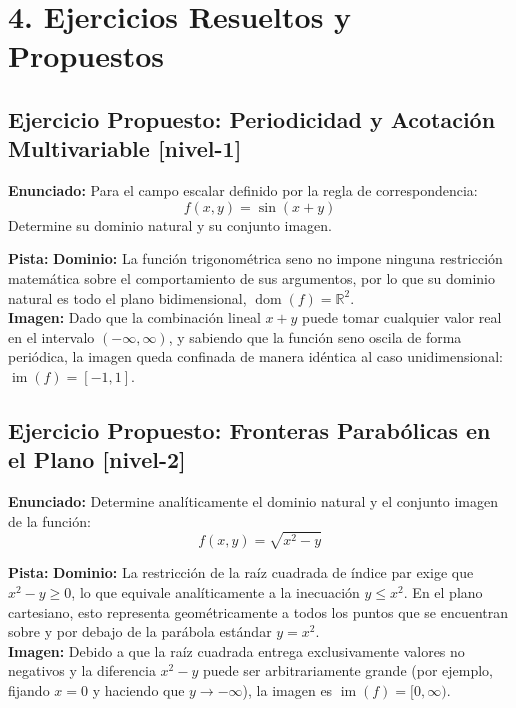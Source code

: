 \documentclass[11pt]{article}
\newenvironment{ejercicios}{%
  \section*{4. Ejercicios Resueltos y Propuestos}%
}{}
\newenvironment{ejerciciopropuesto}[2]{\subsection*{Ejercicio Propuesto: #1 \small{[#2]}}}{}
\newcommand{\enunciado}[1]{\textbf{Enunciado:} #1\par\vspace{0.2cm}}
\newcommand{\pista}[1]{\textbf{Pista:} #1\par\vspace{0.4cm}}
\begin{document}
\begin{ejercicios}
  \begin{ejerciciopropuesto}{Periodicidad y Acotación Multivariable}{nivel-1}
    \enunciado{
      Para el campo escalar definido por la regla de correspondencia:
      $$ f(x,y) = \sin(x+y) $$
      Determine su dominio natural y su conjunto imagen.
    }
    \pista{
      \textbf{Dominio:} La función trigonométrica seno no impone ninguna restricción matemática sobre el comportamiento de sus argumentos, por lo que su dominio natural es todo el plano bidimensional, $\operatorname{dom}(f) = \mathbb{R}^2$. \\
      \textbf{Imagen:} Dado que la combinación lineal $x+y$ puede tomar cualquier valor real en el intervalo $(-\infty, \infty)$, y sabiendo que la función seno oscila de forma periódica, la imagen queda confinada de manera idéntica al caso unidimensional: $\operatorname{im}(f) = [-1, 1]$.
    }
  \end{ejerciciopropuesto}

  \begin{ejerciciopropuesto}{Fronteras Parabólicas en el Plano}{nivel-2}
    \enunciado{
      Determine analíticamente el dominio natural y el conjunto imagen de la función:
      $$ f(x,y) = \sqrt{x^2 - y} $$
    }
    \pista{
      \textbf{Dominio:} La restricción de la raíz cuadrada de índice par exige que $x^2 - y \geq 0$, lo que equivale analíticamente a la inecuación $y \leq x^2$. En el plano cartesiano, esto representa geométricamente a todos los puntos que se encuentran sobre y por debajo de la parábola estándar $y = x^2$. \\
      \textbf{Imagen:} Debido a que la raíz cuadrada entrega exclusivamente valores no negativos y la diferencia $x^2 - y$ puede ser arbitrariamente grande (por ejemplo, fijando $x=0$ y haciendo que $y \to -\infty$), la imagen es $\operatorname{im}(f) = [0, \infty)$.
    }
  \end{ejerciciopropuesto}

\end{ejercicios}
\end{document}
